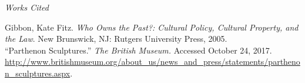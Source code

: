 \documentclass[11pt]{article}
\newenvironment{bib}[1]
  {\begin{list}
          {}
          {\setlength{\itemindent}{-#1}
           \setlength{\leftmargin}{#1}
           \setlength{\itemsep}{0pt}
           \setlength{\parsep}{\parskip}
           \setlength{\topsep}{\parskip}
           }
    \setlength{\parindent}{-#1}
    \item[]
  }
  {\end{list}}
\begin{document}
\newpage
\singlespacing
\begin{center}
{\large\textit{Works Cited}}
\end{center}

\begin{bib}{2em}
Gibbon, Kate Fitz. \textit{Who Owns the Past?: Cultural Policy, Cultural Property, and the Law}. New Brunswick, NJ: Rutgers University Press, 2005. \\

``Parthenon Sculptures.'' \textit{The British Museum.} Accessed October 24, 2017. \url{http://www.britishmuseum.org/about_us/news_and_press/statements/parthenon_sculptures.aspx}. \\
\end{bib}
\end{document}
